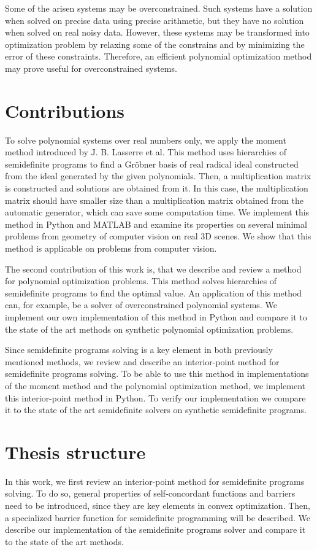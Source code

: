 Some of the arisen systems may be overconstrained.
Such systems have a solution when solved on precise data using precise arithmetic, but they have no solution when solved on real noisy data.
However, these systems may be transformed into optimization problem by relaxing some of the constrains and by minimizing the error of these constraints.
Therefore, an efficient polynomial optimization method may prove useful for overconstrained systems.

\section{Contributions}
To solve polynomial systems over real numbers only, we apply the moment method introduced by J. B. Lasserre et al.
This method uses hierarchies of semidefinite programs to find a Gr\"obner basis of real radical ideal constructed from the ideal generated by the given polynomials.
Then, a multiplication matrix is constructed and solutions are obtained from it.
In this case, the multiplication matrix should have smaller size than a multiplication matrix obtained from the automatic generator, which can save some computation time.
We implement this method in Python and MATLAB and examine its properties on several minimal problems from geometry of computer vision on real 3D scenes.
We show that this method is applicable on problems from computer vision.

The second contribution of this work is, that we describe and review a method for polynomial optimization problems.
This method solves hierarchies of semidefinite programs to find the optimal value.
An application of this method can, for example, be a solver of overconstrained polynomial systems.
We implement our own implementation of this method in Python and compare it to the state of the art methods on synthetic polynomial optimization problems.

Since semidefinite programs solving is a key element in both previously mentioned methods, we review and describe an interior-point method for semidefinite programs solving.
To be able to use this method in implementations of the moment method and the polynomial optimization method, we implement this interior-point method in Python.
To verify our implementation we compare it to the state of the art semidefinite solvers on synthetic semidefinite programs.

\section{Thesis structure}
In this work, we first review an interior-point method for semidefinite programs solving.
To do so, general properties of self-concordant functions and barriers need to be introduced, since they are key elements in convex optimization.
Then, a specialized barrier function for semidefinite programming will be described.
We describe our implementation of the semidefinite programs solver and compare it to the state of the art methods.


